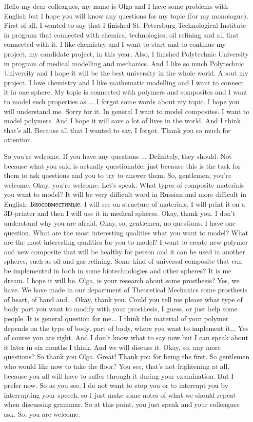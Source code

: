 \documentclass[main.tex]{subfiles}
\begin{document}
Hello my dear colleagues, my name is Olga and I have some problems with English but I hope you will know any questions for my topic (for my monologue).
First of all, I wanted to say that I finished St.
Petersburg Technological Institute in program that connected with chemical technologies, oil refining and all that connected with it.
I like chemistry and I want to start and to continue my project, my candidate project, in this year.
Also, I finished Polytechnic University in program of medical modelling and mechanics.
And I like so much Polytechnic University and I hope it will be the best university in the whole world.
About my project.
I love chemistry and I like mathematic modelling and I want to connect it in one sphere.
My topic is connected with polymers and composites and I want to model such properties as ...
I forgot some words about my topic.
I hope you will understand me.
Sorry for it.
In general I want to model composites.
I want to model polymers.
And I hope it will save a lot of lives in the world.
And I think that's all.
Because all that I wanted to say, I forgot.
Thank you so much for attention.

So you're welcome.
If you have any questions ...
Definitely, they should.
Not because what you said is actually questionable, just because this is the task for them to ask questions and you to try to answer them.
So, gentlemen, you're welcome.
Okay, you're welcome.
Let's speak.
What types of composite materials you want to model?
It will be very difficult word in Russian and more difficult in English.
Биосовместимые.
I will see on structure of materials, I will print it on a 3D-printer and then I will use it in medical spheres.
Okay, thank you.
I don't understand why you are afraid.
Okay, so, gentlemen, no questions.
I have one question.
What are the most interesting qualities what you want to model?
What are the most interesting qualities for you to model?
I want to create new polymer and new composite that will be healthy for person and it can be used in another spheres, such as oil and gas refining.
Some kind of universal composite that can be implemented in both in some biotechnologies and other spheres?
It is me dream.
I hope it will be.
Olga, is your research about some prosthesis?
Yes, we have.
We have made in our department of Theoretical Mechanics some prosthesis of heart, of hand and...
Okay, thank you.
Could you tell me please what type of body part you want to modify with your prosthesis, I guess, or just help some people.
It is general question for me...
I think the material of your polymer depends on the type of body, part of body, where you want to implement it...
Yes of course you are right.
And I don't know what to say now but I can speak about it later in six months I think.
And we will discuss it.
Okay, so, any more questions?
So thank you Olga.
Great!
Thank you for being the first.
So gentlemen who would like now to take the floor?
You see, that's not frightening at all, because you all will have to suffer through it during your examination.
But I prefer now.
So as you see, I do not want to stop you or to interrupt you by interrupting your speech, so I just make some notes of what we should repeat when discussing grammar.
So at this point, you just speak and your colleagues ask.
So, you are welcome.
\end{document}

